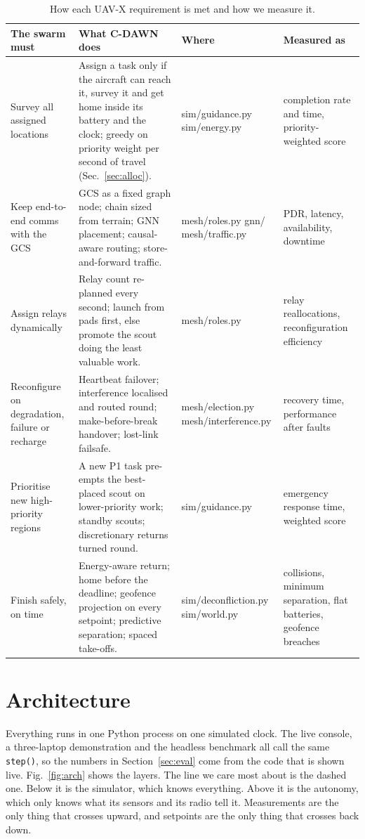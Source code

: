 \documentclass[10pt,a4paper,twocolumn]{article}
\begin{document}
\begin{table}[t]
\centering
\caption{How each UAV-X requirement is met and how we measure it.}
\label{tab:trace}
\footnotesize
\renewcommand{\arraystretch}{1.12}
\begin{tabularx}{\textwidth}{@{}>{\raggedright\arraybackslash}p{30mm}>{\raggedright\arraybackslash}X>{\raggedright\arraybackslash\ttfamily\scriptsize}p{31mm}>{\raggedright\arraybackslash}p{37mm}@{}}
\toprule
\textsf{\textbf{The swarm must}} & \textsf{\textbf{What C-DAWN does}} & \normalfont\textsf{\textbf{Where}} & \textsf{\textbf{Measured as}}\\
\midrule
Survey all assigned locations & Assign a task only if the aircraft can reach it, survey it and get home inside its battery and the clock; greedy on priority weight per second of travel (Sec.~\ref{sec:alloc}). & sim/guidance.py sim/energy.py & completion rate and time, priority-weighted score\\
Keep end-to-end comms with the GCS & GCS as a fixed graph node; chain sized from terrain; GNN placement; causal-aware routing; store-and-forward traffic. & mesh/roles.py gnn/ mesh/traffic.py & PDR, latency, availability, downtime\\
Assign relays dynamically & Relay count re-planned every second; launch from pads first, else promote the scout doing the least valuable work. & mesh/roles.py & relay reallocations, reconfiguration efficiency\\
Reconfigure on degradation, failure or recharge & Heartbeat failover; interference localised and routed round; make-before-break handover; lost-link failsafe. & mesh/election.py mesh/interference.py & recovery time, performance after faults\\
Prioritise new high-priority regions & A new P1 task pre-empts the best-placed scout on lower-priority work; standby scouts; discretionary returns turned round. & sim/guidance.py & emergency response time, weighted score\\
Finish safely, on time & Energy-aware return; home before the deadline; geofence projection on every setpoint; predictive separation; spaced take-offs. & sim/deconfliction.py sim/world.py & collisions, minimum separation, flat batteries, geofence breaches\\
\bottomrule
\end{tabularx}
\end{table}

\section{Architecture}
Everything runs in one Python process on one simulated clock. The live console, a three-laptop demonstration and the headless benchmark all call the same \texttt{step()}, so the numbers in Section~\ref{sec:eval} come from the code that is shown live. Fig.~\ref{fig:arch} shows the layers. The line we care most about is the dashed one. Below it is the simulator, which knows everything. Above it is the autonomy, which only knows what its sensors and its radio tell it. Measurements are the only thing that crosses upward, and setpoints are the only thing that crosses back down.
\end{document}
